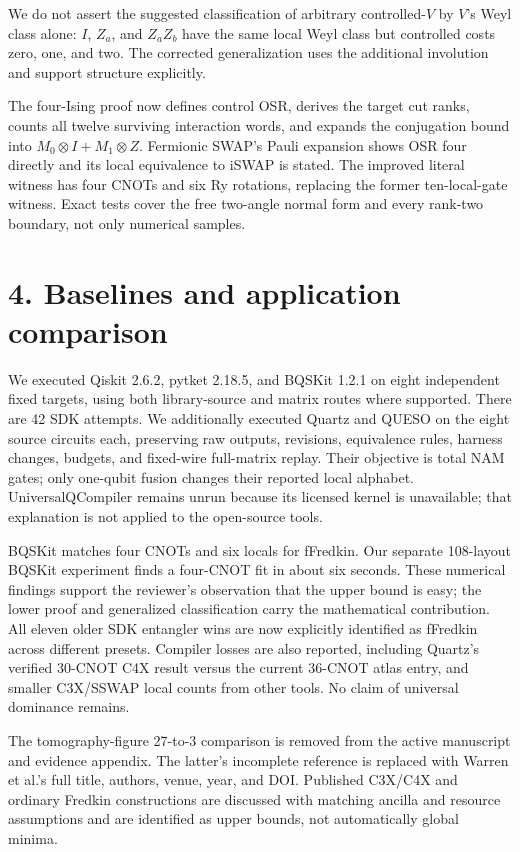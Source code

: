 \documentclass[11pt]{article}
\begin{document}
We do not assert the suggested classification of arbitrary controlled-$V$
by $V$'s Weyl class alone: $I$, $Z_a$, and $Z_aZ_b$ have the same local Weyl
class but controlled costs zero, one, and two. The corrected generalization
uses the additional involution and support structure explicitly.

The four-Ising proof now defines control OSR, derives the target cut ranks,
counts all twelve surviving interaction words, and expands the conjugation
bound into $M_0\otimes I+M_1\otimes Z$. Fermionic SWAP's Pauli expansion
shows OSR four directly and its local equivalence to iSWAP is stated.
The improved literal witness has four CNOTs and six Ry rotations, replacing
the former ten-local-gate witness. Exact tests cover the free two-angle
normal form and every rank-two boundary, not only numerical samples.

\section*{4. Baselines and application comparison}
We executed Qiskit 2.6.2, pytket 2.18.5, and BQSKit 1.2.1 on eight independent
fixed targets, using both library-source and matrix routes where supported.
There are 42 SDK attempts. We additionally executed Quartz and QUESO on the
eight source circuits each, preserving raw outputs, revisions, equivalence
rules, harness changes, budgets, and fixed-wire full-matrix replay. Their
objective is total NAM gates; only one-qubit fusion changes their reported
local alphabet. UniversalQCompiler remains unrun because its licensed kernel
is unavailable; that explanation is not applied to the open-source tools.

BQSKit matches four CNOTs and six locals for fFredkin. Our separate 108-layout
BQSKit experiment finds a four-CNOT fit in about six seconds. These numerical
findings support the reviewer's observation that the upper bound is easy;
the lower proof and generalized classification carry the mathematical
contribution. All eleven older SDK entangler wins are now explicitly
identified as fFredkin across different presets. Compiler losses are also
reported, including Quartz's verified 30-CNOT C4X result versus the current
36-CNOT atlas entry, and smaller C3X/SSWAP local counts from other tools.
No claim of universal dominance remains.

The tomography-figure 27-to-3 comparison is removed from the active manuscript
and evidence appendix. The latter's incomplete reference is replaced with
Warren et al.'s full title, authors, venue, year, and DOI. Published C3X/C4X
and ordinary Fredkin constructions are discussed with matching ancilla and
resource assumptions and are identified as upper bounds, not automatically
global minima.
\end{document}
